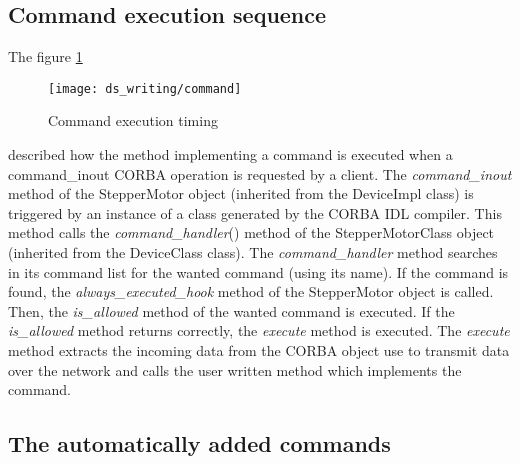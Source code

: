 \subsection{Command execution sequence}

The figure \ref{command_timing_fig}
\begin{figure}[H]
\begin{centering}
\texttt{[image: ds\_writing/command]}
\par\end{centering}

\protect\caption{Command execution timing}
\label{command_timing_fig}
\end{figure}
 described how the method implementing a command is executed when
a command\_inout CORBA operation is requested
by a client. The \emph{command\_inout} method of the StepperMotor
object (inherited from the DeviceImpl class) is triggered by an instance
of a class generated by the CORBA IDL compiler. This
method calls the \emph{command\_handler}()
method of the StepperMotorClass object (inherited from the DeviceClass
class). The \emph{command\_handler} method searches in its command
list for the wanted command (using its name). If the command is found,
the \emph{always\_executed\_hook} method
of the StepperMotor object is called. Then, the \emph{is\_allowed}
method of the wanted command is executed. If the \emph{is\_allowed}
method returns correctly, the \emph{execute} method
is executed. The \emph{execute} method extracts the incoming data
from the CORBA object use to transmit data over the network and calls
the user written method which implements the command.


\subsection{The automatically added commands}
\label{Auto_cmd}

